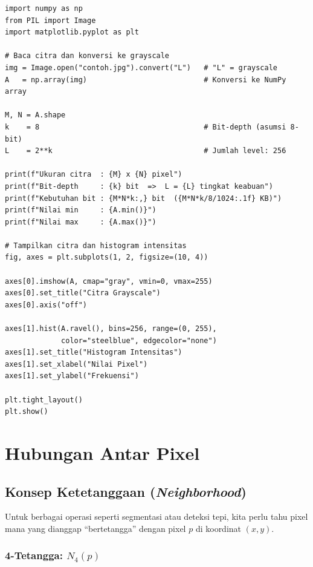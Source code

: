 \documentclass[12pt,a4paper]{article}
\begin{document}
\begin{lstlisting}[caption={Membaca citra dan memeriksa properti dasarnya},
                   label={lst:basic}]
import numpy as np
from PIL import Image
import matplotlib.pyplot as plt
 
# Baca citra dan konversi ke grayscale
img = Image.open("contoh.jpg").convert("L")   # "L" = grayscale
A   = np.array(img)                           # Konversi ke NumPy array
 
M, N = A.shape
k    = 8                                      # Bit-depth (asumsi 8-bit)
L    = 2**k                                   # Jumlah level: 256
 
print(f"Ukuran citra  : {M} x {N} pixel")
print(f"Bit-depth     : {k} bit  =>  L = {L} tingkat keabuan")
print(f"Kebutuhan bit : {M*N*k:,} bit  ({M*N*k/8/1024:.1f} KB)")
print(f"Nilai min     : {A.min()}")
print(f"Nilai max     : {A.max()}")
 
# Tampilkan citra dan histogram intensitas
fig, axes = plt.subplots(1, 2, figsize=(10, 4))
 
axes[0].imshow(A, cmap="gray", vmin=0, vmax=255)
axes[0].set_title("Citra Grayscale")
axes[0].axis("off")
 
axes[1].hist(A.ravel(), bins=256, range=(0, 255),
             color="steelblue", edgecolor="none")
axes[1].set_title("Histogram Intensitas")
axes[1].set_xlabel("Nilai Pixel")
axes[1].set_ylabel("Frekuensi")
 
plt.tight_layout()
plt.show()
\end{lstlisting}
 
\section{Hubungan Antar Pixel}
\label{sec:hubungan}
 
\subsection{Konsep Ketetanggaan (\textit{Neighborhood})}
 
Untuk berbagai operasi seperti segmentasi atau deteksi tepi, kita perlu tahu pixel mana
yang dianggap ``bertetangga'' dengan pixel $p$ di koordinat $(x, y)$.
 
\subsubsection{4-Tetangga: $N_4(p)$}
 
\end{document}
